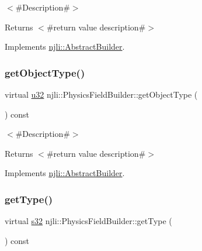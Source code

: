 $<$\#\+Description\#$>$

\begin{DoxyReturn}{Returns}
$<$\#return value description\#$>$ 
\end{DoxyReturn}


Implements \mbox{\hyperlink{classnjli_1_1_abstract_builder_a902f73ea78031b06aca183a417f3413b}{njli\+::\+Abstract\+Builder}}.

\mbox{\label{classnjli_1_1_physics_field_builder_ad4016d00bc62ec1270754dde5b31d835}} 
\subsubsection{\texorpdfstring{get\+Object\+Type()}{getObjectType()}}
{\footnotesize\ttfamily virtual \mbox{\hyperlink{_util_8h_a10e94b422ef0c20dcdec20d31a1f5049}{u32}} njli\+::\+Physics\+Field\+Builder\+::get\+Object\+Type (\begin{DoxyParamCaption}{ }\end{DoxyParamCaption}) const\hspace{0.3cm}{\ttfamily [virtual]}}

$<$\#\+Description\#$>$

\begin{DoxyReturn}{Returns}
$<$\#return value description\#$>$ 
\end{DoxyReturn}


Implements \mbox{\hyperlink{classnjli_1_1_abstract_builder_a0f2d344fcf697b167f4f2b1122b5fb33}{njli\+::\+Abstract\+Builder}}.

\mbox{\label{classnjli_1_1_physics_field_builder_a241d709c0cb9ed68efe50c915a58975f}} 
\subsubsection{\texorpdfstring{get\+Type()}{getType()}}
{\footnotesize\ttfamily virtual \mbox{\hyperlink{_util_8h_aa62c75d314a0d1f37f79c4b73b2292e2}{s32}} njli\+::\+Physics\+Field\+Builder\+::get\+Type (\begin{DoxyParamCaption}{ }\end{DoxyParamCaption}) const\hspace{0.3cm}{\ttfamily [virtual]}}

